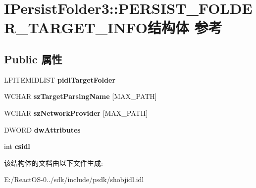 \hypertarget{struct_i_persist_folder3_1_1_p_e_r_s_i_s_t___f_o_l_d_e_r___t_a_r_g_e_t___i_n_f_o}{}\section{I\+Persist\+Folder3\+:\+:P\+E\+R\+S\+I\+S\+T\+\_\+\+F\+O\+L\+D\+E\+R\+\_\+\+T\+A\+R\+G\+E\+T\+\_\+\+I\+N\+F\+O结构体 参考}
\label{struct_i_persist_folder3_1_1_p_e_r_s_i_s_t___f_o_l_d_e_r___t_a_r_g_e_t___i_n_f_o}
\subsection*{Public 属性}
\begin{DoxyCompactItemize}
\item 
\mbox{\label{struct_i_persist_folder3_1_1_p_e_r_s_i_s_t___f_o_l_d_e_r___t_a_r_g_e_t___i_n_f_o_a31abc7fc22e406d1c73854394e14573e}} 
L\+P\+I\+T\+E\+M\+I\+D\+L\+I\+ST {\bfseries pidl\+Target\+Folder}
\item 
\mbox{\label{struct_i_persist_folder3_1_1_p_e_r_s_i_s_t___f_o_l_d_e_r___t_a_r_g_e_t___i_n_f_o_a13de84e30e9c528b5944938dae06edf0}} 
W\+C\+H\+AR {\bfseries sz\+Target\+Parsing\+Name} \mbox{[}M\+A\+X\+\_\+\+P\+A\+TH\mbox{]}
\item 
\mbox{\label{struct_i_persist_folder3_1_1_p_e_r_s_i_s_t___f_o_l_d_e_r___t_a_r_g_e_t___i_n_f_o_a84da9d5b0f72675f7e70530c41d95cb1}} 
W\+C\+H\+AR {\bfseries sz\+Network\+Provider} \mbox{[}M\+A\+X\+\_\+\+P\+A\+TH\mbox{]}
\item 
\mbox{\label{struct_i_persist_folder3_1_1_p_e_r_s_i_s_t___f_o_l_d_e_r___t_a_r_g_e_t___i_n_f_o_a4171846caa8ec226810ee58c49e65127}} 
D\+W\+O\+RD {\bfseries dw\+Attributes}
\item 
\mbox{\label{struct_i_persist_folder3_1_1_p_e_r_s_i_s_t___f_o_l_d_e_r___t_a_r_g_e_t___i_n_f_o_a3fcfc132fc0d5cb9ccc4ae6f48e9474f}} 
int {\bfseries csidl}
\end{DoxyCompactItemize}


该结构体的文档由以下文件生成\+:\begin{DoxyCompactItemize}
\item 
E\+:/\+React\+O\+S-\/0../sdk/include/psdk/shobjidl.\+idl\end{DoxyCompactItemize}
